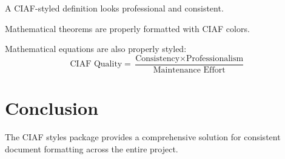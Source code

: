 \documentclass[12pt,a4paper]{article}
\begin{document}
\begin{ciafdefinition}
A CIAF-styled definition looks professional and consistent.
\end{ciafdefinition}

\begin{ciaftheorem}
Mathematical theorems are properly formatted with CIAF colors.
\end{ciaftheorem}

Mathematical equations are also properly styled:
\begin{equation}
\text{CIAF Quality} = \frac{\text{Consistency} \times \text{Professionalism}}{\text{Maintenance Effort}}
\end{equation}

\section{Conclusion}

The CIAF styles package provides a comprehensive solution for consistent document formatting across the entire project.
\end{document}
